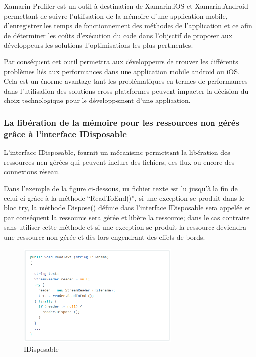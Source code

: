 \documentclass[11]{article}
\begin{document}
Xamarin Profiler est un outil à destination de Xamarin.iOS et Xamarin.Android permettant de suivre l’utilisation de la mémoire d’une application mobile, d’enregistrer les temps de fonctionnement des méthodes de l’application et ce afin de déterminer les coûts d'exécution du code dans l’objectif de proposer aux développeurs les solutions d’optimisations les plus pertinentes.

\vspace{0.5cm}
   
Par conséquent cet outil permettra aux développeurs de trouver les différents problèmes liés aux performances dans une application mobile android ou iOS. Cela est un énorme avantage tant les problématiques en termes de performances dans l’utilisation des solutions cross-plateformes peuvent impacter la décision du choix technologique pour le développement d’une application.
 
 
 \subsubsection{La libération de la mémoire pour les ressources non gérés grâce à l’interface IDisposable}
 
 L’interface IDisposable, fournit un mécanisme permettant la libération des ressources non gérées qui peuvent inclure des fichiers, des flux ou encore des connexions réseau.
 
\vspace{0.5cm}
   
Dans l’exemple de la figure ci-dessous, un fichier texte est lu jusqu’à la fin de celui-ci grâce à la méthode “ReadToEnd()”, si une exception se produit dans le bloc try, la méthode Dispose() définie dans l’interface IDisposable sera appelée et par conséquent la ressource sera gérée et libère la ressource; dans le cas contraire sans utiliser cette méthode et si une exception se produit la ressource deviendra une ressource non gérée et dès lors engendrant des effets de bords.

 
 \begin{figure}[h]
    \centering
    \includegraphics[width=0.7\textwidth]{b1}
    \caption{IDisposable}
    \label{bat}
\end{figure}
 
\end{document}
